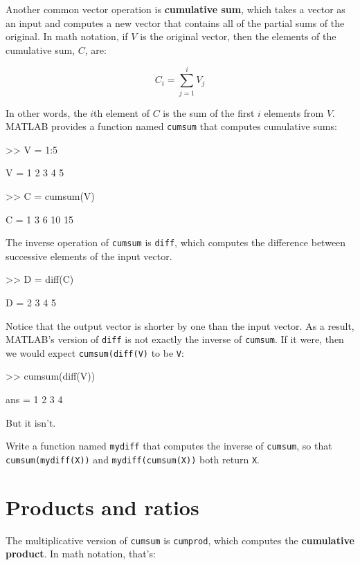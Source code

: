 \documentclass[
]{book}
\numberwithin{Answer}{chapter}
\numberwithin{Exercise}{chapter}
\begin{document}
Another common vector operation is {\bf cumulative sum}, which takes a
vector as an input and computes a new vector that contains all of the
partial sums of the original.  In math notation, if $V$ is the
original vector, then the elements of the cumulative sum, $C$, are:

\begin{equation}
C_i = \sum_{j=1}^i V_j
\end{equation}

In other words, the $i$th element of $C$ is the sum of the first
$i$ elements from $V$.  MATLAB provides a function named {\tt cumsum}
that computes cumulative sums:

\begin{code}
>> V = 1:5

V = 1     2     3     4     5

>> C = cumsum(V)

C = 1     3     6    10    15
\end{code}

The inverse operation of {\tt cumsum} is {\tt diff}, which computes
the difference between successive elements of the input vector.

\begin{code}
>> D = diff(C)

D = 2     3     4     5
\end{code}

Notice that the output vector is shorter by one than the input
vector.  As a result, MATLAB's version of {\tt diff} is not
exactly the inverse of {\tt cumsum}.  If it were, then we would
expect {\tt cumsum(diff(V)} to be {\tt V}:

\begin{code}
>> cumsum(diff(V))

ans = 1     2     3     4
\end{code}

But it isn't.

\begin{ex}
Write a function named {\tt mydiff} that computes the
inverse of {\tt cumsum}, so that {\tt cumsum(mydiff(X))} and
{\tt mydiff(cumsum(X))} both return {\tt X}.

\end{ex}


\section{Products and ratios}

The multiplicative version of {\tt cumsum} is {\tt cumprod},
which computes the {\bf cumulative product}.  In math notation,
that's:
\end{document}
